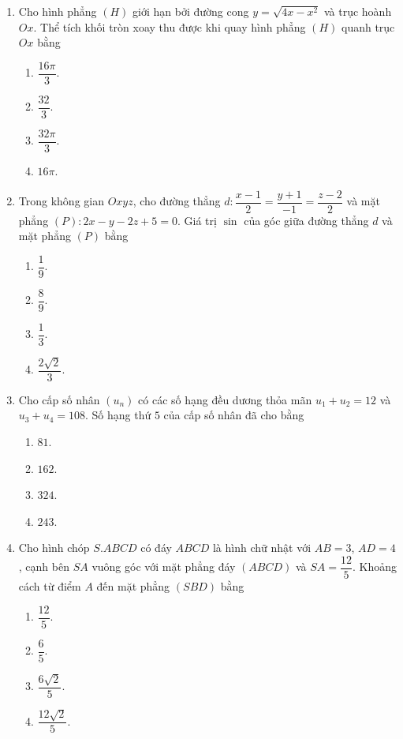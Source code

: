 \documentclass[12pt,a4paper]{article}
\begin{document}
\begin{enumerate}[label=\textbf{Câu \arabic*:}, leftmargin=*]
\item Cho hình phẳng $(H)$ giới hạn bởi đường cong $y = \sqrt{4x - x^2}$ và trục hoành $Ox$. Thể tích khối tròn xoay thu được khi quay hình phẳng $(H)$ quanh trục $Ox$ bằng
\begin{enumerate}[label=\Alph*.]
    \item $\dfrac{16\pi}{3}$.
    \item $\dfrac{32}{3}$.
    \item $\dfrac{32\pi}{3}$.
    \item $16\pi$.
\end{enumerate}

\item Trong không gian $Oxyz$, cho đường thẳng $d: \dfrac{x - 1}{2} = \dfrac{y + 1}{-1} = \dfrac{z - 2}{2}$ và mặt phẳng $(P): 2x - y - 2z + 5 = 0$. Giá trị $\sin$ của góc giữa đường thẳng $d$ và mặt phẳng $(P)$ bằng
\begin{enumerate}[label=\Alph*.]
    \item $\dfrac{1}{9}$.
    \item $\dfrac{8}{9}$.
    \item $\dfrac{1}{3}$.
    \item $\dfrac{2\sqrt{2}}{3}$.
\end{enumerate}

\item Cho cấp số nhân $(u_n)$ có các số hạng đều dương thỏa mãn $u_1 + u_2 = 12$ và $u_3 + u_4 = 108$. Số hạng thứ $5$ của cấp số nhân đã cho bằng
\begin{enumerate}[label=\Alph*.]
    \item $81$.
    \item $162$.
    \item $324$.
    \item $243$.
\end{enumerate}

\item Cho hình chóp $S.ABCD$ có đáy $ABCD$ là hình chữ nhật với $AB = 3$, $AD = 4$, cạnh bên $SA$ vuông góc với mặt phẳng đáy $(ABCD)$ và $SA = \dfrac{12}{5}$. Khoảng cách từ điểm $A$ đến mặt phẳng $(SBD)$ bằng
\begin{enumerate}[label=\Alph*.]
    \item $\dfrac{12}{5}$.
    \item $\dfrac{6}{5}$.
    \item $\dfrac{6\sqrt{2}}{5}$.
    \item $\dfrac{12\sqrt{2}}{5}$.
\end{enumerate}


\end{enumerate}
\end{document}
